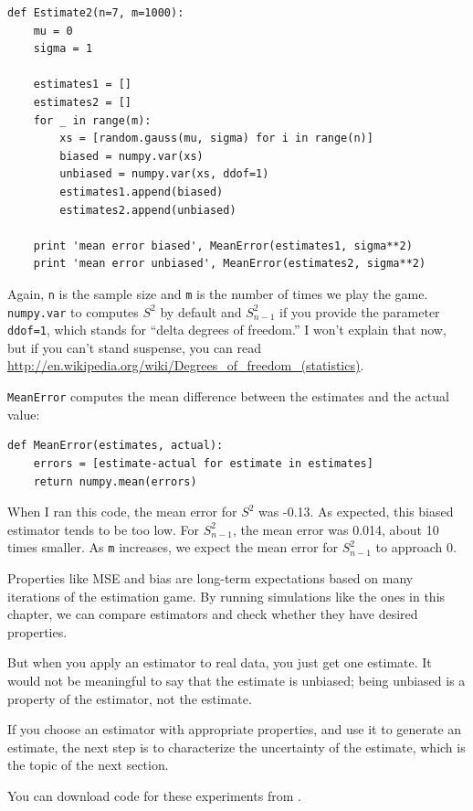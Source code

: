 \documentclass[12pt]{book}
\begin{document}
\begin{verbatim}
def Estimate2(n=7, m=1000):
    mu = 0
    sigma = 1

    estimates1 = []
    estimates2 = []
    for _ in range(m):
        xs = [random.gauss(mu, sigma) for i in range(n)]
        biased = numpy.var(xs)
        unbiased = numpy.var(xs, ddof=1)
        estimates1.append(biased)
        estimates2.append(unbiased)

    print 'mean error biased', MeanError(estimates1, sigma**2)
    print 'mean error unbiased', MeanError(estimates2, sigma**2)
\end{verbatim}

Again, {\tt n} is the sample size and {\tt m} is the number of times
we play the game.  {\tt numpy.var} to computes $S^2$ by default and
$S_{n-1}^2$ if you provide the parameter {\tt ddof=1}, which stands for
``delta degrees of freedom.''  I won't explain that now, but if you
can't stand suspense, you can read
\url{http://en.wikipedia.org/wiki/Degrees_of_freedom_(statistics)}.

{\tt MeanError} computes the mean difference between the estimates
and the actual value:

\begin{verbatim}
def MeanError(estimates, actual):
    errors = [estimate-actual for estimate in estimates]
    return numpy.mean(errors)
\end{verbatim}

When I ran this code, the mean error for $S^2$ was -0.13.  As
expected, this biased estimator tends to be too low.  For $S_{n-1}^2$,
the mean error was 0.014, about 10 times smaller.  As {\tt m}
increases, we expect the mean error for $S_{n-1}^2$ to approach 0.

Properties like MSE and bias are long-term expectations based on
many iterations of the estimation game.  By running simulations like
the ones in this chapter, we can compare estimators and check whether
they have desired properties.

But when you apply an estimator to real
data, you just get one estimate.  It would not be meaningful to say
that the estimate is unbiased; being unbiased is a property of the
estimator, not the estimate.

If you choose an estimator with appropriate properties, and use it to
generate an estimate, the next step is to characterize the
uncertainty of the estimate, which is the topic of the next
section.

You can download code for these experiments from \url{}.
\end{document}
